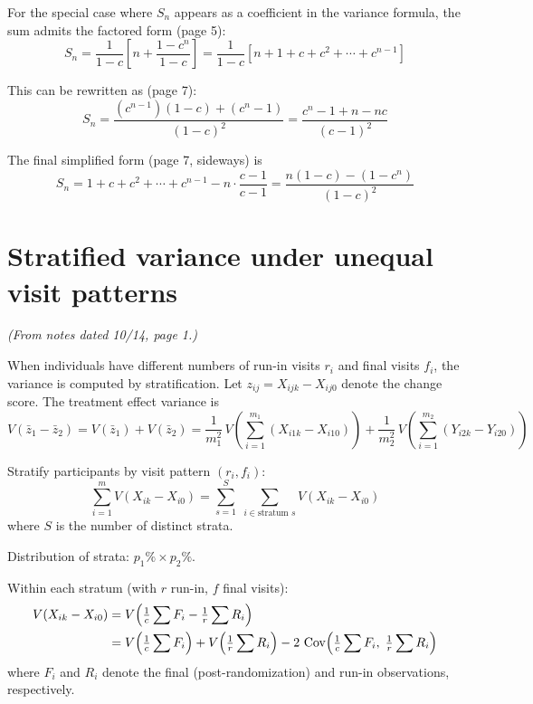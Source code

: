 \documentclass[11pt]{article}
\DeclareMathOperator{\Cov}{Cov}
\begin{document}
For the special case where $S_n$ appears as a coefficient
in the variance formula, the sum admits the factored form
(page 5):
\begin{equation}
  S_n = \frac{1}{1-c}\left[
    n + \frac{1 - c^n}{1 - c}
  \right]
  = \frac{1}{1-c}\left[
    n + 1 + c + c^2 + \cdots + c^{n-1}
  \right]
\end{equation}

This can be rewritten as (page 7):
\begin{equation}
  S_n = \frac{(c^{n-1})(1-c) + (c^n - 1)}{(1-c)^2}
  = \frac{c^n - 1 + n - nc}{(c - 1)^2}
\end{equation}

The final simplified form (page 7, sideways) is
\begin{equation}
  \boxed{
    S_n = 1 + c + c^2 + \cdots + c^{n-1} - n
    \cdot\frac{c - 1}{c - 1}
    = \frac{n(1-c) - (1 - c^n)}{(1-c)^2}
  }
\end{equation}


\section{Stratified variance under unequal visit patterns}
\label{sec:stratified}

\noindent
\textit{(From notes dated 10/14, page 1.)}

\medskip
\noindent
When individuals have different numbers of run-in visits
$r_i$ and final visits $f_i$, the variance is computed by
stratification. Let $z_{ij} = X_{ijk} - X_{ij0}$ denote
the change score. The treatment effect variance is
\begin{equation}
  V(\bar{z}_1 - \bar{z}_2)
  = V(\bar{z}_1) + V(\bar{z}_2)
  = \frac{1}{m_1^2}\,V\!\left(
    \sum_{i=1}^{m_1}(X_{i1k} - X_{i10})\right)
  + \frac{1}{m_2^2}\,V\!\left(
    \sum_{i=1}^{m_2}(Y_{i2k} - Y_{i20})\right)
\end{equation}

Stratify participants by visit pattern
$(r_i, f_i)$:
\begin{equation}
  \sum_{i=1}^{m} V(X_{ik} - X_{i0})
  = \sum_{s=1}^{S}\; \sum_{i \in \text{stratum } s}
    V(X_{ik} - X_{i0})
\end{equation}
where $S$ is the number of distinct strata.

Distribution of strata: $p_1 \% \times p_2 \%$.

Within each stratum (with $r$ run-in, $f$ final visits):
\begin{align}
  V(X_{ik} - X_{i0})
  &= V\!\left(
    \tfrac{1}{c}\sum F_i - \tfrac{1}{r}\sum R_i
  \right) \notag \\
  &= V\!\left(\tfrac{1}{c}\sum F_i\right)
    + V\!\left(\tfrac{1}{r}\sum R_i\right)
    - 2\,\Cov\!\left(
      \tfrac{1}{c}\sum F_i,\;
      \tfrac{1}{r}\sum R_i
    \right)
\end{align}
where $F_i$ and $R_i$ denote the final (post-randomization)
and run-in observations, respectively.
\end{document}
